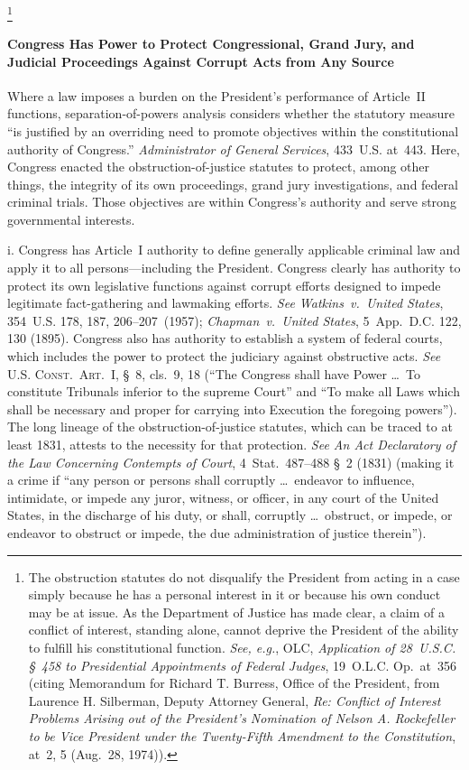 \footnote{The obstruction statutes do not disqualify the President from acting in a case simply because he has a personal interest in it or because his own conduct may be at issue.
As the Department of Justice has made clear, a claim of a conflict of interest, standing alone, cannot deprive the President of the ability to fulfill his constitutional function.
\textit{See, e.g.}, OLC, \textit{Application of 28~U.S.C. \S~458 to Presidential Appointments of Federal Judges}, 19~O.L.C. Op.\ at~356 (citing Memorandum for Richard T. Burress, Office of the President, from Laurence H. Silberman, Deputy Attorney General, \textit{Re: Conflict of Interest Problems Arising out of the President's Nomination of Nelson A. Rockefeller to be Vice President under the Twenty-Fifth Amendment to the Constitution}, at~2, 5 (Aug.~28, 1974)).}

\paragraph{Congress Has Power to Protect Congressional, Grand Jury, and Judicial Proceedings Against Corrupt Acts from Any Source}

Where a law imposes a burden on the President's performance of Article~II functions, separation-of-powers analysis considers whether the statutory measure ``is justified by an overriding need to promote objectives within the constitutional authority of Congress.''
\textit{Administrator of General Services}, 433~U.S. at~443.
Here, Congress enacted the obstruction-of-justice statutes to protect, among other things, the integrity of its own proceedings, grand jury investigations, and federal criminal trials.
Those objectives are within Congress's authority and serve strong governmental interests.

i. Congress has Article~I authority to define generally applicable criminal law and apply it to all persons---including the President.
Congress clearly has authority to protect its own legislative functions against corrupt efforts designed to impede legitimate fact-gathering and lawmaking efforts.
\textit{See Watkins~v.\ United States}, 354~U.S. 178, 187, 206--207~(1957);
\textit{Chapman~v.\ United States}, 5~App.\ D.C. 122, 130 (1895).
Congress also has authority to establish a system of federal courts, which includes the power to protect the judiciary against obstructive acts.
\textit{See} \textsc{U.S. Const.\ Art.~I}, \S~8, cls.~9, 18 (``The Congress shall have Power \dots\ To constitute Tribunals inferior to the supreme Court'' and ``To make all Laws which shall be necessary and proper for carrying into Execution the foregoing powers'').
The long lineage of the obstruction-of-justice statutes, which can be traced to at least 1831, attests to the necessity for that protection.
\textit{See An Act Declaratory of the Law Concerning Contempts of Court}, 4~Stat.~487--488 \S~2 (1831) (making it a crime if ``any person or persons shall corruptly \dots\ endeavor to influence, intimidate, or impede any juror, witness, or officer, in any court of the United States, in the discharge of his duty, or shall, corruptly \dots\ obstruct, or impede, or endeavor to obstruct or impede, the due administration of justice therein'').

